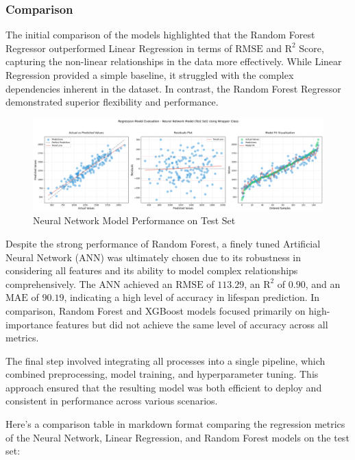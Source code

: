 \documentclass{article}
\begin{document}
\subsubsection{Comparison}

The initial comparison of the models highlighted that the Random Forest Regressor outperformed Linear Regression in terms of $\text{RMSE}$ and $\text{R}^2$ Score, capturing the non-linear relationships in the data more effectively. While Linear Regression provided a simple baseline, it struggled with the complex dependencies inherent in the dataset. In contrast, the Random Forest Regressor demonstrated superior flexibility and performance.

\begin{figure}[htbp]
    \centering
    \includegraphics[width=1\textwidth]{./Images/NeuralNetworkModel-TestSet-1.png}
    \caption{Neural Network Model Performance on Test Set}
    \label{fig:neural_network_model_performance}
\end{figure}

Despite the strong performance of Random Forest, a finely tuned Artificial Neural Network (ANN) was ultimately chosen due to its robustness in considering all features and its ability to model complex relationships comprehensively. The ANN achieved an $\text{RMSE}$ of $113.29$, an $\text{R}^2$ of $0.90$, and an $\text{MAE}$ of $90.19$, indicating a high level of accuracy in lifespan prediction. In comparison, Random Forest and XGBoost models focused primarily on high-importance features but did not achieve the same level of accuracy across all metrics.

The final step involved integrating all processes into a single pipeline, which combined preprocessing, model training, and hyperparameter tuning. This approach ensured that the resulting model was both efficient to deploy and consistent in performance across various scenarios.

Here's a comparison table in markdown format comparing the regression metrics of the Neural Network, Linear Regression, and Random Forest models on the test set:
\end{document}
